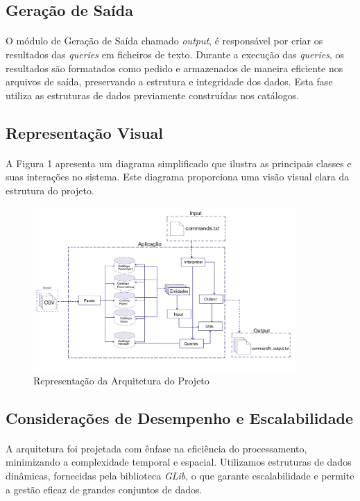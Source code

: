 \documentclass{article}
\begin{document}
\subsection{Geração de Saída}
\paragraph{}O módulo de Geração de Saída chamado \textit{output}, é responsável por criar os resultados das \textit{queries} em ficheiros de texto. Durante a execução das \textit{queries}, os resultados são formatados como pedido e armazenados de maneira eficiente nos arquivos de saída, preservando a estrutura e integridade dos dados. Esta fase utiliza as estruturas de dados previamente construídas nos catálogos.

\subsection{Representação Visual}
\paragraph{}A Figura 1 apresenta um diagrama simplificado que ilustra as principais classes e suas interações no sistema. Este diagrama proporciona uma visão visual clara da estrutura do projeto.
\begin{figure}[H]
\begin{center}
	\includegraphics[width=10cm]{Images/arquitetura.png} 
        \caption{Representação da Arquitetura do Projeto}
\end{center}
\end{figure}

\subsection{Considerações de Desempenho e Escalabilidade}
\paragraph{}A arquitetura foi projetada com ênfase na eficiência do processamento, minimizando a complexidade temporal e espacial. Utilizamos estruturas de dados dinâmicas, fornecidas pela biblioteca \textit{GLib}, o que garante escalabilidade e permite a gestão eficaz de grandes conjuntos de dados. 
\end{document}

